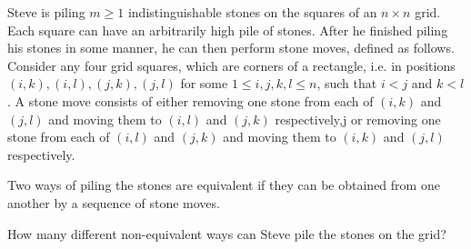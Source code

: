 Steve is piling $m\geq 1$ indistinguishable stones on the squares of an $n\times n$ grid.  Each square can have an arbitrarily high pile of stones.  After he finished piling his stones in some manner, he can then perform stone moves, defined as follows.  Consider any four grid squares, which are corners of a rectangle, i.e. in positions $(i, k), (i, l), (j, k), (j, l)$ for some $1\leq i, j, k, l\leq n$,  such that $i<j$ and $k<l$.  A stone move consists of either removing one stone from each of $(i, k)$ and $(j, l)$ and moving them to $(i, l)$ and $(j, k)$ respectively,j or removing one stone from each of $(i, l)$ and $(j, k)$ and moving them to $(i, k)$ and $(j, l)$ respectively.

Two ways of piling the stones are equivalent if they can be obtained from one another by a sequence of stone moves.

How many different non-equivalent ways can Steve pile the stones on the grid?